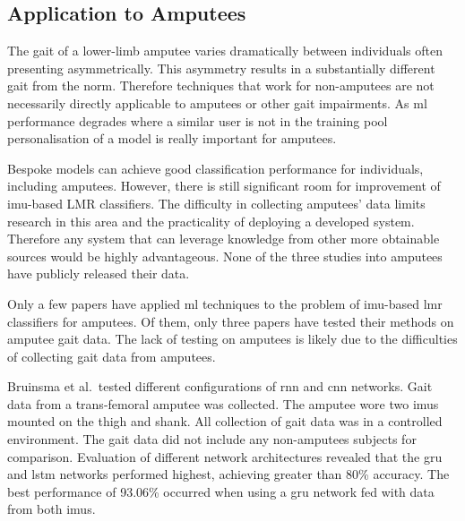 \subsection{Application to Amputees}
The gait of a lower-limb amputee varies dramatically between individuals\cite{Lonini2016} often presenting asymmetrically\cite{Roerdink2012}. This asymmetry results in a substantially different gait from the norm. Therefore techniques that work for non-amputees are not necessarily directly applicable to amputees or other gait impairments\cite{Jamieson2021}. As \acrshort{ml} performance degrades where a similar user is not in the training pool personalisation of a model is really important for amputees.

Bespoke models can achieve good classification performance for individuals, including amputees. However, there is still significant room for improvement of \acrshort{imu}-based LMR classifiers. The difficulty in collecting amputees' data limits research in this area and the practicality of deploying a developed system. Therefore any system that can leverage knowledge from other more obtainable sources would be highly advantageous. None of the three studies into amputees have publicly released their data.

Only a few papers have applied \acrshort{ml} techniques to the problem of \acrshort{imu}-based \acrshort{lmr} classifiers for amputees. Of them, only three papers have tested their methods on amputee gait data\cite{Lu2020, Bruinsma2021, Jamieson2021}. The lack of testing on amputees is likely due to the difficulties of collecting gait data from amputees\cite{Gardiner2016}.

Bruinsma et al.~tested different configurations of \acrshort{rnn} and \acrshort{cnn} networks. Gait data from a trans-femoral amputee was collected. The amputee wore two \acrshort{imu}s mounted on the thigh and shank. All collection of gait data was in a controlled environment. The gait data did not include any non-amputees subjects for comparison. Evaluation of different network architectures revealed that the \acrfull{gru} and \acrshort{lstm} networks performed highest, achieving greater than 80\% accuracy. The best performance of  93.06\% occurred when using a \acrshort{gru} network fed with data from both \acrshort{imu}s.\cite{Bruinsma2021}

